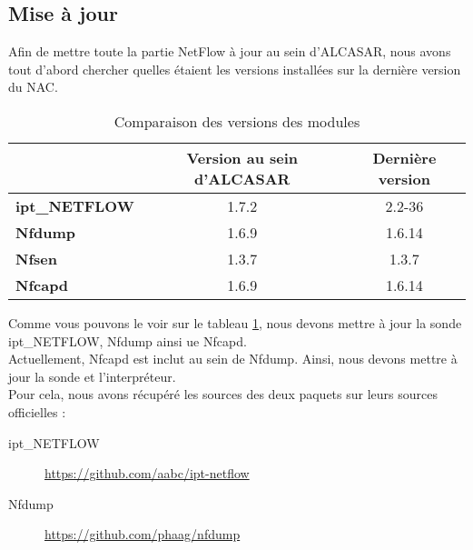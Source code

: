 \subsection{Mise à jour}
Afin de mettre toute la partie NetFlow à jour au sein d'ALCASAR, nous avons tout d'abord chercher quelles étaient les versions installées sur la dernière version du NAC.
\begin{table}[H]
    \centering
    \begin{tabularx}{\textwidth}{|l|c|c|}
	\hline
	& \textbf{Version au sein d'ALCASAR} & \textbf{Dernière version}\\\toprule
	\textbf{ipt\_NETFLOW} & 1.7.2 & 2.2-36\\\hline
 	\textbf{Nfdump} & 1.6.9 & 1.6.14\\\hline
 	\textbf{Nfsen} & 1.3.7 & 1.3.7\\\hline
 	\textbf{Nfcapd} & 1.6.9 & 1.6.14\\\hline
    \end{tabularx}
    \caption{Comparaison des versions des modules}
    \label{tab:1}
\end{table}
Comme vous pouvons le voir sur le tableau \ref{tab:1}, nous devons mettre à jour la sonde ipt\_NETFLOW, Nfdump ainsi ue Nfcapd.\\
Actuellement, Nfcapd est inclut au sein de Nfdump. Ainsi, nous devons mettre à jour la sonde et l'interpréteur.\\
Pour cela, nous avons récupéré les sources des deux paquets sur leurs sources officielles :
\begin{description}
 \item[ipt\_NETFLOW] \url{https://github.com/aabc/ipt-netflow}
 \item[Nfdump] \url{https://github.com/phaag/nfdump}
\end{description}

